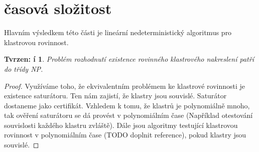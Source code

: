 \documentclass[12pt,a4report]{report}
\newtheorem{tvr}{Tvrzen: í}[chapter]
\begin{document}
\section{časová složitost}
Hlavním výsledkem této části je lineární nedeterministický algoritmus pro klastrovou rovinnost.
\begin{tvr}
Problém rozhodnutí existence rovinného klastrového nakreslení patří do třídy NP.
\end{tvr}
\begin{proof}
Využíváme toho, že ekvivalentním problémem ke klastrové rovinnosti je existence saturátoru. Ten nám zajistí, že klastry jsou souvislé. Saturátor dostaneme jako certifikát. Vzhledem k tomu, že klastrů je polynomiálně mnoho, tak ověření saturátoru se dá provést  v polynomiálním čase (Například otestování souvislosti každého klastru zvláště). Dále jsou algoritmy testující klastrovou rovinnost v polynomiálním čase (TODO doplnit reference), pokud klastry jsou souvislé. 
\end{proof}
\end{document}
